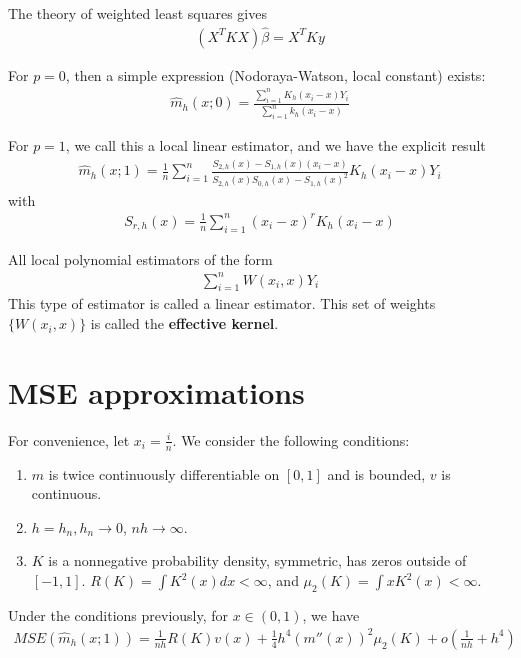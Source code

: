 The theory of weighted least squares gives
\begin{align}
  \label{eq:53}
  (X^{T} K X) \hat \beta = X^{T} K y
\end{align}

For $p = 0$, then a simple expression (Nodoraya-Watson, local constant)
exists:
\begin{align}
  \label{eq:54}
  \hat m_{h}(x; 0) = \frac{\sum_{i=1}^{n} K_{h}(x_{i} -
    x)Y_{i}}{\sum_{i=1}^{n} k_{h}(x_{i} - x)}
\end{align}


For $p= 1$, we call this a local linear estimator, and we have the
explicit result
\begin{align}
  \label{eq:55}
  \hat m_{h}(x; 1) = \frac{1}{n} \sum_{i=1}^{n} \frac{S_{2, h}(x) -
    S_{1, h}(x)(x_{i} - x)}{S_{2, h}(x) S_{0, h}(x) - S_{1, h}(x)^{2}}
  K_{h}(x_{i} - x) Y_{i}
\end{align}
with
\begin{align}
  \label{eq:56}
  S_{r, h}(x) = \frac{1}{n} \sum_{i=1}^{n} (x_{i} - x)^{r} K_{h}(x_{i}
  - x)
\end{align}

All local polynomial estimators of the form
\begin{align}
  \label{eq:57}
  \sum_{i=1}^{n} W(x_{i}, x) Y_{i}
\end{align}
This type of estimator is called a linear estimator.   This set of
weights $\{ W(x_{i}, x) \}$ is called the \textbf{effective kernel}.

\section{MSE approximations}
\label{sec:mse-approxmiations}

For convenience, let $x_{i} = \frac{i}{n}$.  We consider the following
conditions:

\begin{enumerate}
\item $m$ is twice continuously differentiable on $[0, 1]$ and is bounded, $v$ is continuous.
\item $h = h_{n}, h_{n} \rightarrow 0$, $nh \rightarrow \infty$.
\item $K$ is a nonnegative probability density, symmetric, has zeros
  outside of $[-1, 1]$. $R(K) = \int K^{2}(x) dx < \infty$, and
  $\mu_{2}(K) = \int x K^{2}(x) < \infty$.
\end{enumerate}

\begin{thm}
  \label{defn:nonparametric_regression:1}
  Under the conditions previously, for $x \in (0, 1)$, we have
  \begin{align}
    \label{eq:58}
    MSE(\hat m_{h}(x; 1)) = \frac{1}{nh} R(K) v(x) + \frac{1}{4} h^{4}
    (m''(x))^{2} \mu_{2}(K) + o(\frac{1}{nh} + h^{4})
  \end{align}
\end{thm}

